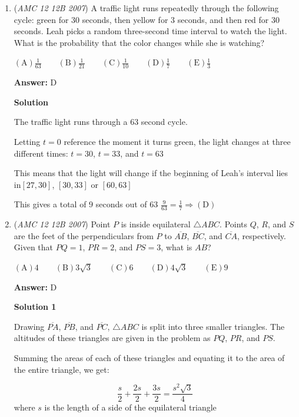 \begin{enumerate}
	\item (\textit{AMC 12 12B 2007}) A traffic light runs repeatedly through the following cycle: green for $30$ seconds, then yellow for $3$ seconds, and then red for $30$ seconds. Leah picks a random three-second time interval to watch the light. What is the probability that the color changes while she is watching?


 $\mathrm {(A)} \frac{1}{63}\qquad \mathrm {(B)} \frac{1}{21}\qquad \mathrm {(C)} \frac{1}{10}\qquad \mathrm {(D)} \frac{1}{7}\qquad \mathrm {(E)} \frac{1}{3}$

 \textbf{Answer: }D



\textbf{Solution}

The traffic light runs through a $63$ second cycle.

 Letting $t=0$ reference the moment it turns green, the light changes at three different times: $t=30$, $t=33$, and $t=63$

 This means that the light will change if the beginning of Leah's interval lies in$[27,30]$, $[30,33]$ or $[60,63]$

 This gives a total of $9$ seconds out of $63$
$\frac{9}{63} = \frac{1}{7} \Rightarrow \mathrm{(D)}$



	\item (\textit{AMC 12 12B 2007}) Point $P$ is inside equilateral $\triangle ABC$. Points $Q$, $R$, and $S$ are the feet of the perpendiculars from $P$ to $\overline{AB}$, $\overline{BC}$, and $\overline{CA}$, respectively. Given that $PQ=1$, $PR=2$, and $PS=3$, what is $AB$?


 $\mathrm {(A)} 4\qquad \mathrm {(B)} 3\sqrt{3}\qquad \mathrm {(C)} 6\qquad \mathrm {(D)} 4\sqrt{3}\qquad \mathrm {(E)} 9$

 \textbf{Answer: }D



\textbf{Solution 1}

Drawing $\overline{PA}$, $\overline{PB}$, and $\overline{PC}$, $\triangle ABC$ is split into three smaller triangles. The altitudes of these triangles are given in the problem as $PQ$, $PR$, and $PS$.

 Summing the areas of each of these triangles and equating it to the area of the entire triangle, we get:

 
 \[\frac{s}{2} + \frac{2s}{2} + \frac{3s}{2} = \frac{s^2\sqrt{3}}{4}\]where $s$ is the length of a side of the equilateral triangle


\end{enumerate}
